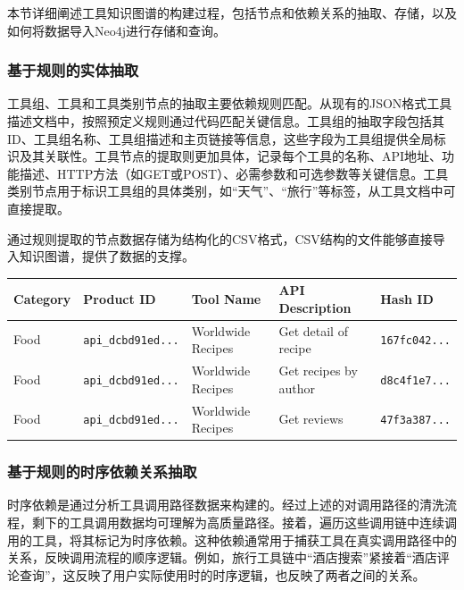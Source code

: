 本节详细阐述工具知识图谱的构建过程，包括节点和依赖关系的抽取、存储，以及如何将数据导入Neo4j进行存储和查询。

\subsubsection{基于规则的实体抽取}

工具组、工具和工具类别节点的抽取主要依赖规则匹配。从现有的JSON格式工具描述文档中，按照预定义规则通过代码匹配关键信息。工具组的抽取字段包括其ID、工具组名称、工具组描述和主页链接等信息，这些字段为工具组提供全局标识及其关联性。工具节点的提取则更加具体，记录每个工具的名称、API地址、功能描述、HTTP方法（如GET或POST）、必需参数和可选参数等关键信息。工具类别节点用于标识工具组的具体类别，如“天气”、“旅行”等标签，从工具文档中可直接提取。

通过规则提取的节点数据存储为结构化的CSV格式，CSV结构的文件能够直接导入知识图谱，提供了数据的支撑。

\begin{table}[ht]
\centering
{}
\label{tab:csv-example}
\renewcommand{\arraystretch}{1.2}
\scriptsize %
\begin{tabular}{|l|l|l|p{6cm}|l|}
\hline
\textbf{Category} & \textbf{Product ID} & \textbf{Tool Name} & \textbf{API Description} & \textbf{Hash ID} \\ \hline
Food & \texttt{api\_dcbd91ed...} & Worldwide Recipes & Get detail of recipe & \texttt{167fc042...} \\ \hline
Food & \texttt{api\_dcbd91ed...} & Worldwide Recipes & Get recipes by author & \texttt{d8c4f1e7...} \\ \hline
Food & \texttt{api\_dcbd91ed...} & Worldwide Recipes & Get reviews & \texttt{47f3a387...} \\ \hline
\end{tabular}
\end{table}

\subsubsection{基于规则的时序依赖关系抽取}

时序依赖是通过分析工具调用路径数据来构建的。经过上述的对调用路径的清洗流程，剩下的工具调用数据均可理解为高质量路径。接着，遍历这些调用链中连续调用的工具，将其标记为时序依赖。这种依赖通常用于捕获工具在真实调用路径中的关系，反映调用流程的顺序逻辑。例如，旅行工具链中“酒店搜索”紧接着“酒店评论查询”，这反映了用户实际使用时的时序逻辑，也反映了两者之间的关系。

